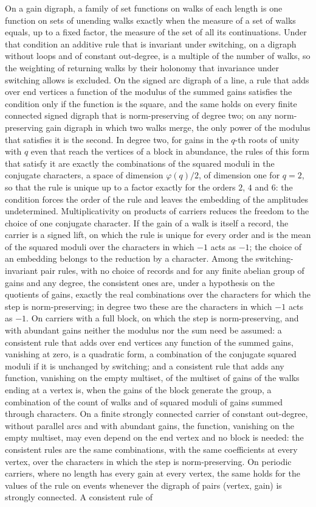 \documentclass[11pt,a4paper]{article}
\begin{document}
\begin{titlepage}
On a gain digraph, a family of set functions on walks of each length is one function on sets of unending walks exactly when the measure of a set of walks equals, up to a fixed factor, the measure of the set of all its continuations. Under that condition an additive rule that is invariant under switching, on a digraph without loops and of constant out-degree, is a multiple of the number of walks, so the weighting of returning walks by their holonomy that invariance under switching allows is excluded. On the signed arc digraph of a line, a rule that adds over end vertices a function of the modulus of the summed gains satisfies the condition only if the function is the square, and the same holds on every finite connected signed digraph that is norm-preserving of degree two; on any norm-preserving gain digraph in which two walks merge, the only power of the modulus that satisfies it is the second. In degree two, for gains in the $q$-th roots of unity with $q$ even that reach the vertices of a block in abundance, the rules of this form that satisfy it are exactly the combinations of the squared moduli in the conjugate characters, a space of dimension $\varphi(q)/2$, of dimension one for $q=2$, so that the rule is unique up to a factor exactly for the orders $2$, $4$ and $6$: the condition forces the order of the rule and leaves the embedding of the amplitudes undetermined. Multiplicativity on products of carriers reduces the freedom to the choice of one conjugate character. If the gain of a walk is itself a record, the carrier is a signed lift, on which the rule is unique for every order and is the mean of the squared moduli over the characters in which $-1$ acts as $-1$; the choice of an embedding belongs to the reduction by a character. Among the switching-invariant pair rules, with no choice of records and for any finite abelian group of gains and any degree, the consistent ones are, under a hypothesis on the quotients of gains, exactly the real combinations over the characters for which the step is norm-preserving; in degree two these are the characters in which $-1$ acts as $-1$. On carriers with a full block, on which the step is norm-preserving, and with abundant gains neither the modulus nor the sum need be assumed: a consistent rule that adds over end vertices any function of the summed gains, vanishing at zero, is a quadratic form, a combination of the conjugate squared moduli if it is unchanged by switching; and a consistent rule that adds any function, vanishing on the empty multiset, of the multiset of gains of the walks ending at a vertex is, when the gains of the block generate the group, a combination of the count of walks and of squared moduli of gains summed through characters. On a finite strongly connected carrier of constant out-degree, without parallel arcs and with abundant gains, the function, vanishing on the empty multiset, may even depend on the end vertex and no block is needed: the consistent rules are the same combinations, with the same coefficients at every vertex, over the characters in which the step is norm-preserving. On periodic carriers, where no length has every gain at every vertex, the same holds for the values of the rule on events whenever the digraph of pairs (vertex, gain) is strongly connected. A consistent rule of 
\end{titlepage}
\end{document}
